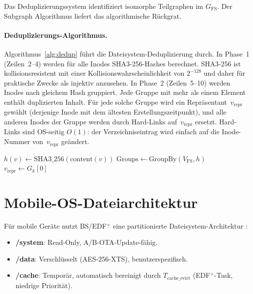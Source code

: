 ﻿\documentclass[a4paper,12pt]{scrreprt}
\theoremstyle{definition}
\begin{document}
	Das Deduplizierungssystem \cite{Epp2026dusgraph} identifiziert
	isomorphe Teilgraphen im $G_{\mathrm{FS}}$. Der Subgraph Algorithmus
	\cite{Epp2026subgraph} liefert das algorithmische Rückgrat.

	\paragraph{Deduplizierungs-Algorithmus.}
	Algorithmus~\ref{alg:dedup} führt die Dateisystem-Deduplizierung durch.
	In Phase~1 (Zeilen~2--4) werden für alle Inodes SHA3-256-Hashes berechnet.
	SHA3-256 ist kollisionsresistent mit einer Kollisionswahrscheinlichkeit
	von $2^{-128}$ und daher für praktische Zwecke als injektiv anzusehen.
	In Phase~2 (Zeilen~5--10) werden Inodes nach gleichem Hash gruppiert.
	Jede Gruppe mit mehr als einem Element enthält duplizierten Inhalt.
	Für jede solche Gruppe wird ein Repräsentant~$v_{\mathrm{repr}}$ gewählt
	(derjenige Inode mit dem ältesten Erstellungszeitpunkt), und alle anderen
	Inodes der Gruppe werden durch Hard-Links auf~$v_{\mathrm{repr}}$ ersetzt.
	Hard-Links sind OS-seitig $O(1)$: der Verzeichniseintrag wird einfach
	auf die Inode-Nummer von~$v_{\mathrm{repr}}$ geändert.

	\begin{algorithm}[H]
		\caption{Dateisystem-Deduplizierung}
		\label{alg:dedup}
		\begin{algorithmic}[1]
			\State $h(v) \gets \mathrm{SHA3\_256}(\mathrm{content}(v))$
			\EndFor
			\State $\mathrm{Groups} \gets \mathrm{GroupBy}(V_{\mathrm{FS}}, h)$
			\State $v_{\mathrm{repr}} \gets G_k[0]$
			\State {}
			\EndFor
			\EndFor
			\EndProcedure
		\end{algorithmic}
	\end{algorithm}
	
	\section{Mobile-OS-Dateiarchitektur}
	
	Für mobile Geräte nutzt BS/EDF$^+$ eine partitionierte Dateisystem-Architektur
	\cite{Epp2026mobde}:
	\begin{itemize}
		\item \textbf{/system}: Read-Only, A/B-OTA-Update-fähig.
		\item \textbf{/data}: Verschlüsselt (AES-256-XTS), benutzerspezifisch.
		\item \textbf{/cache}: Temporär, automatisch bereinigt durch
		$T_{\mathrm{cache\_evict}}$ (EDF$^+$-Task, nie\-drige Priorität).
	\end{itemize}
	
\end{document}
